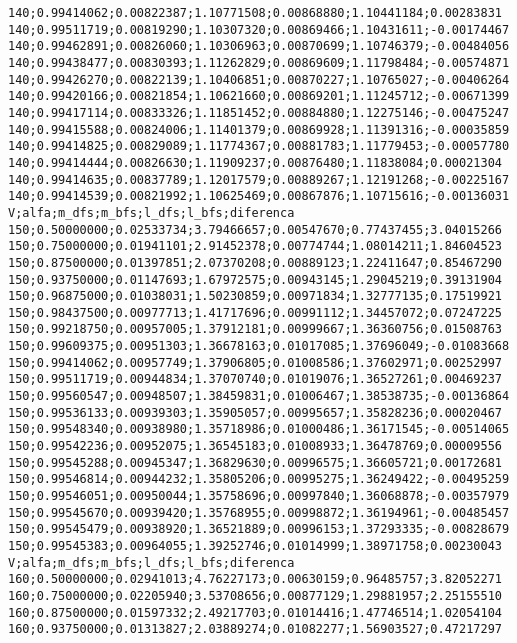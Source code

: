 \documentclass[brazil,times]{abnt}
\begin{document}
{\begin{verbatim}
140;0.99414062;0.00822387;1.10771508;0.00868880;1.10441184;0.00283831
140;0.99511719;0.00819290;1.10307320;0.00869466;1.10431611;-0.00174467
140;0.99462891;0.00826060;1.10306963;0.00870699;1.10746379;-0.00484056
140;0.99438477;0.00830393;1.11262829;0.00869609;1.11798484;-0.00574871
140;0.99426270;0.00822139;1.10406851;0.00870227;1.10765027;-0.00406264
140;0.99420166;0.00821854;1.10621660;0.00869201;1.11245712;-0.00671399
140;0.99417114;0.00833326;1.11851452;0.00884880;1.12275146;-0.00475247
140;0.99415588;0.00824006;1.11401379;0.00869928;1.11391316;-0.00035859
140;0.99414825;0.00829089;1.11774367;0.00881783;1.11779453;-0.00057780
140;0.99414444;0.00826630;1.11909237;0.00876480;1.11838084;0.00021304
140;0.99414635;0.00837789;1.12017579;0.00889267;1.12191268;-0.00225167
140;0.99414539;0.00821992;1.10625469;0.00867876;1.10715616;-0.00136031
V;alfa;m_dfs;m_bfs;l_dfs;l_bfs;diferenca
150;0.50000000;0.02533734;3.79466657;0.00547670;0.77437455;3.04015266
150;0.75000000;0.01941101;2.91452378;0.00774744;1.08014211;1.84604523
150;0.87500000;0.01397851;2.07370208;0.00889123;1.22411647;0.85467290
150;0.93750000;0.01147693;1.67972575;0.00943145;1.29045219;0.39131904
150;0.96875000;0.01038031;1.50230859;0.00971834;1.32777135;0.17519921
150;0.98437500;0.00977713;1.41717696;0.00991112;1.34457072;0.07247225
150;0.99218750;0.00957005;1.37912181;0.00999667;1.36360756;0.01508763
150;0.99609375;0.00951303;1.36678163;0.01017085;1.37696049;-0.01083668
150;0.99414062;0.00957749;1.37906805;0.01008586;1.37602971;0.00252997
150;0.99511719;0.00944834;1.37070740;0.01019076;1.36527261;0.00469237
150;0.99560547;0.00948507;1.38459831;0.01006467;1.38538735;-0.00136864
150;0.99536133;0.00939303;1.35905057;0.00995657;1.35828236;0.00020467
150;0.99548340;0.00938980;1.35718986;0.01000486;1.36171545;-0.00514065
150;0.99542236;0.00952075;1.36545183;0.01008933;1.36478769;0.00009556
150;0.99545288;0.00945347;1.36829630;0.00996575;1.36605721;0.00172681
150;0.99546814;0.00944232;1.35805206;0.00995275;1.36249422;-0.00495259
150;0.99546051;0.00950044;1.35758696;0.00997840;1.36068878;-0.00357979
150;0.99545670;0.00939420;1.35768955;0.00998872;1.36194961;-0.00485457
150;0.99545479;0.00938920;1.36521889;0.00996153;1.37293335;-0.00828679
150;0.99545383;0.00964055;1.39252746;0.01014999;1.38971758;0.00230043
V;alfa;m_dfs;m_bfs;l_dfs;l_bfs;diferenca
160;0.50000000;0.02941013;4.76227173;0.00630159;0.96485757;3.82052271
160;0.75000000;0.02205940;3.53708656;0.00877129;1.29881957;2.25155510
160;0.87500000;0.01597332;2.49217703;0.01014416;1.47746514;1.02054104
160;0.93750000;0.01313827;2.03889274;0.01082277;1.56903527;0.47217297

\end{verbatim}}
\end{document}
